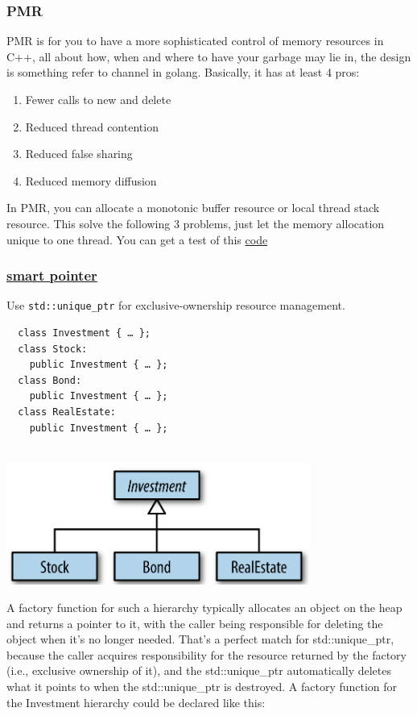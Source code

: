 \documentclass[a4paper]{exam}
\theoremstyle{definition}
\begin{document}
\subsubsection{PMR}
PMR is for you to have a more sophisticated control of memory resources in C++, all about how, when and where to have your garbage may lie in, the design is something refer to channel in golang. Basically, it has at least 4 pros:
\begin{enumerate}
  \item Fewer calls to new and delete
  \item Reduced thread contention
  \item Reduced false sharing
  \item Reduced memory diffusion
\end{enumerate} 
In PMR, you can allocate a monotonic buffer resource or local thread stack resource. This solve the following 3 problems, just let the memory allocation unique to one thread. You can get a test of this \href{https://github.com/lefticus/cpp_weekly/blob/master/PMR/performance_tests.cpp}{code}
\subsubsection{\href{https://www.oreilly.com/library/view/effective-modern-c/9781491908419/ch04.html}{smart pointer}}
Use \texttt{std::unique\_ptr} for exclusive-ownership resource management. \\
\begin{verbatim}
  class Investment { … };
  class Stock:
    public Investment { … };
  class Bond:
    public Investment { … };
  class RealEstate:
    public Investment { … };
\end{verbatim} \\
\includegraphics[width=10cm]{img/oop.png}

A factory function for such a hierarchy typically allocates an object on the heap and returns a pointer to it, with the caller being responsible for deleting the object when it’s no longer needed. That’s a perfect match for std::unique\_ptr, because the caller acquires responsibility for the resource returned by the factory (i.e., exclusive ownership of it), and the std::unique\_ptr automatically deletes what it points to when the std::unique\_ptr is destroyed. A factory function for the Investment hierarchy could be declared like this:
\end{document}
